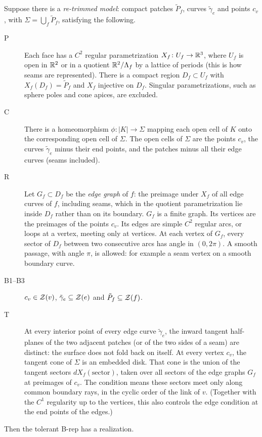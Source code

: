 \begin{proposition}\label{prop:Bprime}
Suppose there is a \emph{re-trimmed model}: compact patches $\tilde P_f$, curves $\tilde\gamma_e$ and points $c_v$, with
$\Sigma=\bigcup_f\tilde P_f$, satisfying the following.
\begin{description}
\item[P] Each face has a $C^2$ regular parametrization $X_f\colon U_f\to\mathbb{R}^3$, where $U_f$ is open in $\mathbb{R}^2$ or in a
quotient $\mathbb{R}^2/\Lambda_f$ by a lattice of periods (this is how seams are represented). There is a compact region
$D_f\subset U_f$ with $X_f(D_f)=\tilde P_f$ and $X_f$ injective on $D_f$. Singular parametrizations, such as sphere
poles and cone apices, are excluded.
\item[C] There is a homeomorphism $\phi\colon|K|\to\Sigma$ mapping each open cell of $K$ onto the corresponding open cell
of $\Sigma$. The open cells of $\Sigma$ are the points $c_v$, the curves $\tilde\gamma_e$ minus their end points, and the
patches minus all their edge curves (seams included).
\item[R] Let $G_f\subset D_f$ be the \emph{edge graph} of $f$: the preimage under $X_f$ of all edge curves of $f$,
including seams, which in the quotient parametrization lie inside $D_f$ rather than on its boundary. $G_f$ is a finite
graph. Its vertices are the preimages of the points $c_v$. Its edges are simple $C^2$ regular arcs, or loops at a
vertex, meeting only at vertices. At each vertex of $G_f$, every sector of $D_f$ between two consecutive arcs has angle
in $(0,2\pi)$. A smooth passage, with angle $\pi$, is allowed: for example a seam vertex on a smooth boundary curve.
\item[B1--B3] $c_v\in\mathcal{Z}(v)$, $\tilde\gamma_e\subseteq\mathcal{Z}(e)$ and $\tilde P_f\subseteq\mathcal{Z}(f)$.
\item[T] At every interior point of every edge curve $\tilde\gamma_e$, the inward tangent half-planes of the two adjacent
patches (or of the two sides of a seam) are distinct: the surface does not fold back on itself. At every vertex $c_v$,
the tangent cone of $\Sigma$ is an embedded disk. That cone is the union of the tangent sectors $dX_f(\text{sector})$,
taken over all sectors of the edge graphs $G_f$ at preimages of $c_v$. The condition means these sectors meet only along
common boundary rays, in the cyclic order of the link of $v$. (Together with the $C^1$ regularity up to the vertices,
this also controls the edge condition at the end points of the edges.)
\end{description}
Then the tolerant B-rep has a realization.
\end{proposition}

